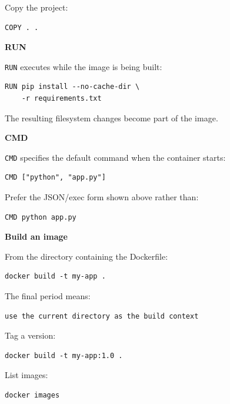 \documentclass[11pt,letterpaper]{article}
\begin{document}
Copy the project:

\begin{lstlisting}
COPY . .
\end{lstlisting}

\textbf{RUN}

\texttt{RUN} executes while the image is being built:

\begin{lstlisting}
RUN pip install --no-cache-dir \
    -r requirements.txt
\end{lstlisting}

The resulting filesystem changes become part of the image.

\textbf{CMD}

\texttt{CMD} specifies the default command when the container starts:

\begin{lstlisting}
CMD ["python", "app.py"]
\end{lstlisting}

Prefer the JSON/exec form shown above rather than:

\begin{lstlisting}
CMD python app.py
\end{lstlisting}



\textbf{Build an image}

From the directory containing the Dockerfile:

\begin{lstlisting}
docker build -t my-app .
\end{lstlisting}

The final period means:

\begin{lstlisting}
use the current directory as the build context
\end{lstlisting}

Tag a version:

\begin{lstlisting}
docker build -t my-app:1.0 .
\end{lstlisting}

List images:

\begin{lstlisting}
docker images
\end{lstlisting}


\end{document}
